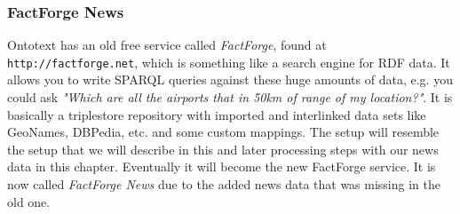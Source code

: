 \subsubsection{FactForge News}
Ontotext has an old free service called \textit{FactForge}, found at \texttt{http://factforge.net}, which is something like a search engine for RDF data. It allows you to write SPARQL queries against these huge amounts of data, e.g. you could ask \textit{"Which are all the airports that in 50km of range of my location?"}. It is basically a triplestore repository with imported and interlinked data sets like GeoNames, DBPedia, etc. and some custom mappings. The setup will resemble the setup that we will describe in this and later processing steps with our news data in this chapter. Eventually it will become the new FactForge service. It is now called \textit{FactForge News} due to the added news data that was missing in the old one. 

